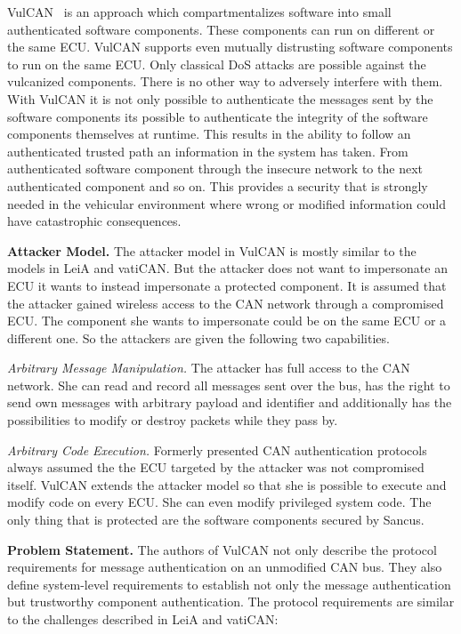 VulCAN~\cite{VanBulck2017} is an approach which compartmentalizes software into
small authenticated software components. These components can run on different
or the same ECU\@. VulCAN supports even mutually distrusting software components
to run on the same ECU\@. Only classical DoS attacks are possible against the
vulcanized components. There is no other way to adversely interfere with them.
With VulCAN it is not only possible to authenticate the messages sent by the
software components its possible to authenticate the integrity of the software
components themselves at runtime. This results in the ability to follow an
authenticated trusted path an information in the system has taken. From
authenticated software component through the insecure network to the next
authenticated component and so on. This provides a security that is strongly
needed in the vehicular environment where wrong or modified information could
have catastrophic consequences.

\par{\textbf{Attacker Model.}} The attacker model in VulCAN is mostly similar to the
models in LeiA and vatiCAN\@. But the attacker does not want to impersonate an
ECU it wants to instead impersonate a protected component. It is assumed that
the attacker gained wireless access to the CAN network through a compromised
ECU\@. The component she wants to impersonate could be on the same ECU or a
different one. So the attackers are given the following two capabilities.

\textit{Arbitrary Message Manipulation.} The attacker has full access to the CAN
network. She can read and record all messages sent over the bus, has the right
to send own messages with arbitrary payload and identifier and additionally has
the possibilities to modify or destroy packets while they pass by.

\textit{Arbitrary Code Execution.} Formerly presented CAN authentication
protocols always assumed the the ECU targeted by the attacker was not
compromised itself. VulCAN extends the attacker model so that she is possible to
execute and modify code on every ECU\@. She can even modify privileged system
code. The only thing that is protected are the software components secured by
Sancus.

\par{\textbf{Problem Statement.}} The authors of VulCAN not only describe the
protocol requirements for message authentication on an unmodified CAN bus. They
also define system-level requirements to establish not only the message
authentication but trustworthy component authentication. The protocol
requirements are similar to the challenges described in LeiA and vatiCAN\@:

